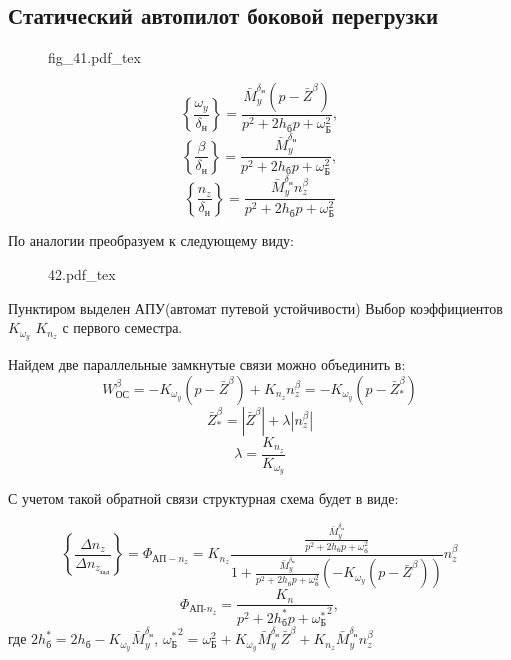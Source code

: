 \documentclass{article}
\begin{document}
\subsection{Статический автопилот боковой перегрузки}

\begin{figure}[H]
	\centering
	{fig_41.pdf_tex}
\end{figure}

\[
	\left\{\frac{\omega_y}{\delta_\text{н}}\right\} =
	\frac{\bar{M}_y^{\delta_\text{н}}(p - \bar{Z}^\beta)}{ p^2 + 2 h_\text{б}p
	+ \omega_\text{Б}^2 },
\]
\[
	\left\{ \frac{\beta}{\delta_\text{н}} \right\} = \frac{
	\bar{M}_y^{\delta_\text{н}} }{ p^2 + 2 h_\text{б}p + \omega_\text{Б}^2 }
	,\]
\[
	\left\{ \frac{n_z}{\delta_\text{н}} \right\} = \frac{
	\bar{M}_y^{\delta_\text{н}} n_z^\beta }{ p^2 + 2 h_\text{б}p +
	\omega_\text{Б}^2 }
\]

По аналогии преобразуем к следующему виду:

\begin{figure}[H]
	\centering
	{42.pdf_tex}
\end{figure}


Пунктиром выделен АПУ(автомат путевой устойчивости)
Выбор коэффициентов $K_{\omega_y}$ $K_{n_z}$ с первого семестра.

Найдем две параллельные замкнутые связи можно объединить в:
\[
	W_\text{ОС}^\beta = - K_{\omega_y} (p - \bar{Z}^\beta) + K_{n_z} n_z^\beta
	= - K_{\omega_y}(p - \bar{Z}_*^\beta)
\]
\[
	\bar{Z}_*^\beta = |\bar{Z}^\beta| + \lambda |n_z^\beta|
\]
\[
	\lambda = \frac{K_{n_z}}{K_{\omega_y}}
\]

С учетом такой обратной связи структурная схема будет в виде:

\begin{figure}[ht]
	\centering
	\label{fig:fig_49}
\end{figure}

\[
	\left\{\frac{\Delta n_z}{\Delta n_{z_\text{зад}}} \right\}  =
	\Phi_{\text{АП}-n_z} = K_{n_z}\frac{\frac{\bar{M}_y^{\delta_\text{н}}}{p^2
	+ 2 h_\text{б} p + \omega_\text{б}^2}}{1
	+\frac{\bar{M}_y^{\delta_\text{н}}}{p^2 + 2 h_\text{б} p + \omega_\text{б}^2}
	(-K_{\omega_y}(p - \bar{Z}^\beta))}n_z^\beta
\]
\[
	\Phi_{\text{АП-}n_z} =\frac{K_n}{ p^2 + 2 h_\text{б}^*p +
	{\omega_\text{Б}^*}^2  },
\]
где $2h_\text{б}^* = 2h_\text{б} - K_{\omega_y}\bar{M}_y^{\delta_\text{н}}$,
${\omega_\text{Б}^*}^2 = \omega_\text{Б}^2 +
	K_{\omega_y}\bar{M}_y^{\delta_\text{н}} \bar{Z}^\beta + K_{n_z}
	\bar{M}_y^{\delta_\text{н}} n_z^\beta $
\end{document}
